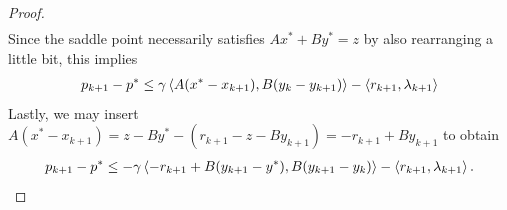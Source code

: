 \begin{proof}
\begin{equation}
\begin{aligned}
        \end{aligned}
    \end{equation}
    Since the saddle point necessarily satisfies $Ax^* + By^* = z$ by also rearranging a little bit, this implies
    \begin{equation}
        \begin{aligned}
            p_{k+1} - p^*
            \leq \gamma \left\langle A (x^*-x_{k+1}) , B(y_k-y_{k+1})\right\rangle - \left\langle r_{k+1} , \lambda_{k+1}\right\rangle
        \end{aligned}
    \end{equation}
    Lastly, we may insert $A(x^* - x_{k+1}) = z - By^* - (r_{k+1} - z - By_{k+1}) = -r_{k+1} + By_{k+1}$ to obtain
    \begin{equation}\label{duality:eq:proof_admm3}
        \begin{aligned}
            p_{k+1} - p^*
            \leq -\gamma \left\langle-r_{k+1} + B(y_{k+1}-y^*) , B(y_{k+1}-y_k)\right\rangle - \left\langle r_{k+1} , \lambda_{k+1}\right\rangle.
        \end{aligned}
    \end{equation}

\end{proof}
